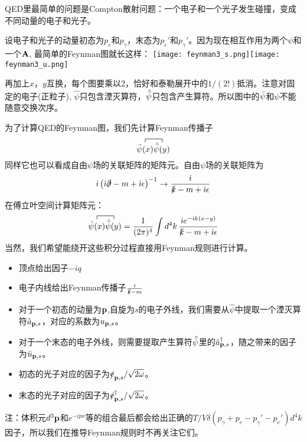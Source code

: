 \documentclass[CJK]{beamer}
\begin{document}
\begin{frame}
\bch
{\small
QED里最简单的问题是Compton散射问题：一个电子和一个光子发生碰撞，变成不同动量的电子和光子。
\skipline

设电子和光子的动量初态为$p_e$和$p_\gamma$，末态为$p_e'$和$p_\gamma'$。因为现在相互作用为两个$\psi$和一个${\mathbf{A}}$, 最简单的Feynman图就长这样：
\texttt{[image: feynman3\_s.png]}\texttt{[image: feynman3\_u.png]}

再加上$x$，$y$互换，每个图要乘以2，恰好和泰勒展开中的$1/(2!)$抵消。注意对固定的电子(正粒子), $\hat\psi$只包含湮灭算符，$\hat{\bar{\psi}}$只包含产生算符。所以图中的$\bar{\psi}$和$\psi$不能随意交换次序。}
\ech
\end{frame}


\begin{frame}
\bch
为了计算QED的Feynman图，我们先计算Feynman传播子
$$\contr{\hat\psi(x)}{\hat{\barpsi}(y)}$$
同样它也可以看成自由$\psi$场的关联矩阵的矩阵元。自由$\psi$场的关联矩阵为
$$ {\dot{\imath}}\left({\dot{\imath}} \slashed{\partial}-m + {\dot{\imath}}\epsilon\right)^{-1} \rightarrow \frac{{\dot{\imath}}}{\slashed{k} - m + {\dot{\imath}}\epsilon}$$
在傅立叶空间计算矩阵元：
$$\contr{\hat\psi(x)}{\hat{\barpsi}(y)} = \frac{1}{(2\pi)^4}\int d^4k\, \frac{\ii e^{-\ii k(x-y)}}{\slashed{k} - m + \ii\epsilon} $$
当然，我们希望能绕开这些积分过程直接用Feynman规则进行计算。
\ech
\end{frame}

\begin{frame}
\bch
{\small
\begin{itemize}
\item{顶点给出因子$-iq$}
\item{电子内线给出Feynman传播子$\frac{{\dot{\imath}}}{\slashed{k}-m}$}
\item{对于一个初态的动量为${\mathbf{p}}$,自旋为$s$的电子外线，我们需要从$\hat\psi$中提取一个湮灭算符${\hat{a}}_{{\mathbf{p}},s}$，对应的系数为$u_{{\mathbf{p}}, s}$。}
\item{对于一个末态的电子外线，则需要提取产生算符$\hat{\bar{\psi}}$里的${\hat{a}^\dagger}_{{\mathbf{p}},s}$，随之带来的因子为$\bar{u}_{{\mathbf{p}},s}$。}
\item{初态的光子对应的因子为$\slashed{\mathrm{e}}_{{\mathbf{p}},s}/\sqrt{2\omega}$。}
\item{末态的光子对应的因子为$\slashed{\mathrm{e}}^\dagger_{{\mathbf{p}},s}/\sqrt{2\omega}$。}
\end{itemize}

{\scriptsize
注：体积元$d^3{\mathbf{p}}$和$e^{-ipx}$等的组合最后都会给出正确的$T/V\delta(p_\gamma+p_e - p_\gamma'-p_e')d^4k$因子，所以我们在推导Feynman规则时不再关注它们。}

}

\ech
\end{frame}
\end{document}
